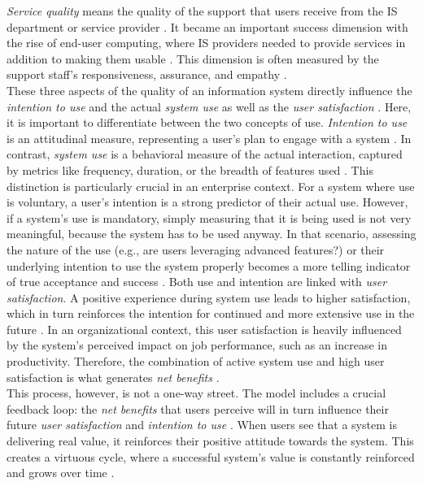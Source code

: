 \documentclass[
	english,
	ruledheaders=section,%
	class=report,%
	thesis={type=bachelor},%
	accentcolor=1b,%
	custommargins=true,%
	marginpar=false,%
	parskip=half-,%
	fontsize=11pt,%
	DIV=14,
]{tudapub}
\begin{document}
\textit{Service quality} means the quality of the support that users receive from the IS department or service provider \parencite[p.~18]{DeloneMcLean2003ISSuccessTenYearUpdate}. It became an important success dimension with the rise of end-user computing, where IS providers needed to provide services in addition to making them usable \parencite[p.~18]{DeloneMcLean2003ISSuccessTenYearUpdate}. This dimension is often measured by the support staff's responsiveness, assurance, and empathy \parencite[p.~18]{DeloneMcLean2003ISSuccessTenYearUpdate}.
\\
These three aspects of the quality of an information system directly influence the \textit{intention to use} and the actual \textit{system use} as well as the \textit{user satisfaction} \parencite[p.~23--24]{DeloneMcLean2003ISSuccessTenYearUpdate}. Here, it is important to differentiate between the two concepts of use. \textit{Intention to use} is an attitudinal measure, representing a user's plan to engage with a system \parencite[p.~23]{DeloneMcLean2003ISSuccessTenYearUpdate}. In contrast, \textit{system use} is a behavioral measure of the actual interaction, captured by metrics like frequency, duration, or the breadth of features used \parencite[p.~66]{DeloneMcLean1992ISSuccess}. This distinction is particularly crucial in an enterprise context. For a system where use is voluntary, a user's intention is a strong predictor of their actual use. However, if a system's use is mandatory, simply measuring that it is being used is not very meaningful, because the system has to be used anyway. In that scenario, assessing the nature of the use (e.g., are users leveraging advanced features?) or their underlying intention to use the system properly becomes a more telling indicator of true acceptance and success
\parencite[p.~66]{DeloneMcLean1992ISSuccess}. Both use and intention are linked with \textit{user satisfaction}. A positive experience during system use leads to higher satisfaction, which in turn reinforces the intention for continued and more extensive use in the future \parencite[p.~23]{DeloneMcLean2003ISSuccessTenYearUpdate}. In an organizational context, this user satisfaction is heavily influenced by the system's perceived impact on job performance, such as an increase in productivity. Therefore, the combination of active system use and high user satisfaction is what generates \textit{net benefits} \parencite[p.~23]{DeloneMcLean2003ISSuccessTenYearUpdate}.\\
This process, however, is not a one-way street. The model includes a crucial feedback loop: the \textit{net benefits} that users perceive will in turn influence their future \textit{user satisfaction} and \textit{intention to use} \parencite[p.~23-24]{DeloneMcLean2003ISSuccessTenYearUpdate}. When users see that a system is delivering real value, it reinforces their positive attitude towards the system. This creates a virtuous cycle, where a successful system's value is constantly reinforced and grows over time \parencite[p.~23]{DeloneMcLean2003ISSuccessTenYearUpdate}.\\
\end{document}
